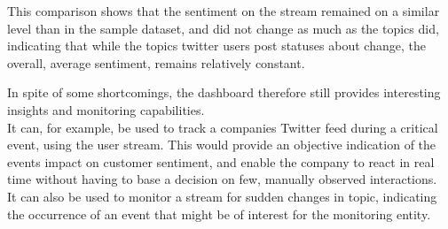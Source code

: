 \begin{figure}
\begin{subfigure}[t]{0.505\textwidth}
    \end{subfigure}
\end{figure}

This comparison shows that the sentiment on the stream remained on a similar level than in the sample dataset,
and did not change as much as the topics did, indicating that while the topics twitter users post statuses about change,
the overall, average sentiment, remains relatively constant.

In spite of some shortcomings, the dashboard therefore still provides interesting insights and monitoring capabilities.\\
It can, for example, be used to track a companies Twitter feed during a critical event, using the user stream.
This would provide an objective indication of the events impact on customer sentiment,
and enable the company to react in real time without having to base a decision on few, manually observed interactions.\\
It can also be used to monitor a stream for sudden changes in topic,
indicating the occurrence of an event that might be of interest for the monitoring entity.
